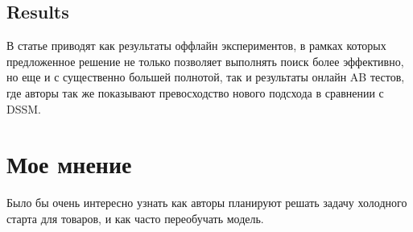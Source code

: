 \subsection*{Results} 

В статье приводят как результаты оффлайн экспериментов, в рамках которых предложенное решение не только позволяет выполнять поиск более эффективно, но еще и с существенно большей полнотой, так и результаты онлайн AB тестов, где авторы так же показывают превосходство нового подсхода в сравнении с DSSM.

\section*{Мое мнение}

Было бы очень интересно узнать как авторы планируют решать задачу холодного старта для товаров, и как часто переобучать модель.